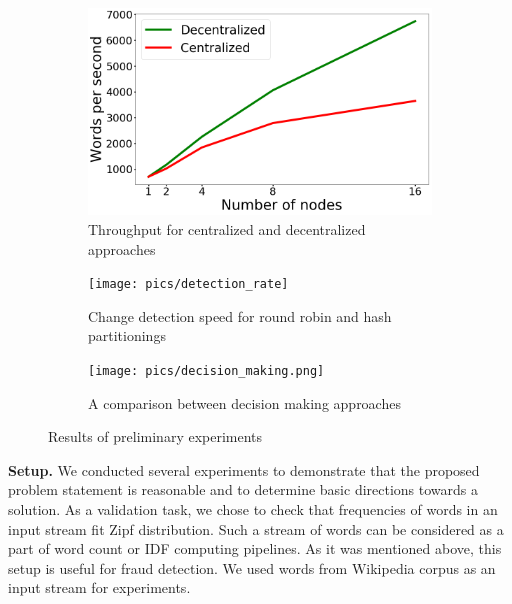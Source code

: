\label {fs-short-experiments}

\begin{figure}[t!]
    \begin{subfigure}[b]{0.31\textwidth}
            \includegraphics[width=\linewidth]{pics/throughput}
            \caption{Throughput for centralized and decentralized approaches}
            \label{throughput}
    \end{subfigure}%
    \hspace{5mm}
    \begin{subfigure}[b]{0.31\textwidth}
            \texttt{[image: pics/detection\_rate]}
            \caption{Change detection speed for round robin and hash partitionings}
            \label{detection_rate}
    \end{subfigure}%
    \hspace{5mm}
    \begin{subfigure}[b]{0.31\textwidth}
            \texttt{[image: pics/decision\_making.png]}
            \caption{A comparison between decision making approaches}
            \label{decision_making}
    \end{subfigure}%
    \caption{Results of preliminary experiments}
\end{figure}


\indent

{\bf Setup.} We conducted several experiments to demonstrate that the proposed problem statement is reasonable and to determine basic directions towards a solution. As a validation task, we chose to check that frequencies of words in an input stream fit Zipf distribution. Such a stream of words can be considered as a part of word count or IDF computing pipelines. As it was mentioned above, this setup is useful for fraud detection. We used words from Wikipedia corpus as an input stream for experiments.

